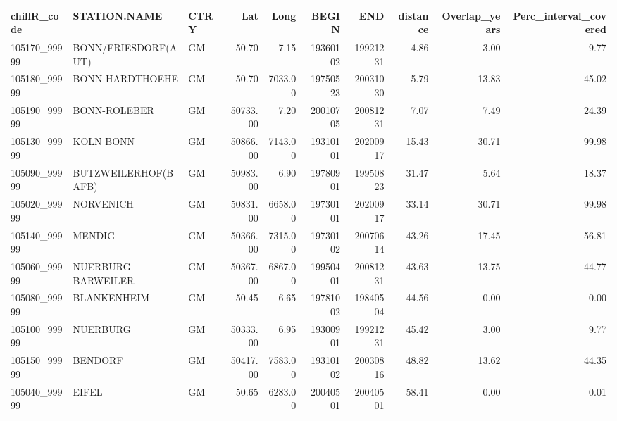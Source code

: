 \documentclass[
]{book}
\newenvironment{Shaded}{\begin{snugshade}}{\end{snugshade}}
\newcommand{\DataTypeTok}[1]{\textcolor[rgb]{0.13,0.29,0.53}{#1}}
\newcommand{\DecValTok}[1]{\textcolor[rgb]{0.00,0.00,0.81}{#1}}
\newcommand{\KeywordTok}[1]{\textcolor[rgb]{0.13,0.29,0.53}{\textbf{#1}}}
\newcommand{\NormalTok}[1]{#1}
\newcommand{\OperatorTok}[1]{\textcolor[rgb]{0.81,0.36,0.00}{\textbf{#1}}}
\newcommand{\StringTok}[1]{\textcolor[rgb]{0.31,0.60,0.02}{#1}}
\begin{document}
\begin{Shaded}
\end{Shaded}

\begingroup\fontsize{8}{10}\selectfont

\begin{tabular}{l|l|l|r|r|r|r|r|r|r}
\hline
chillR\_code & STATION.NAME & CTRY & Lat & Long & BEGIN & END & distance & Overlap\_years & Perc\_interval\_covered\\
\hline
105170\_99999 & BONN/FRIESDORF(AUT) & GM & 50.70 & 7.15 & 19360102 & 19921231 & 4.86 & 3.00 & 9.77\\
\hline
105180\_99999 & BONN-HARDTHOEHE & GM & 50.70 & 7033.00 & 19750523 & 20031030 & 5.79 & 13.83 & 45.02\\
\hline
105190\_99999 & BONN-ROLEBER & GM & 50733.00 & 7.20 & 20010705 & 20081231 & 7.07 & 7.49 & 24.39\\
\hline
105130\_99999 & KOLN BONN & GM & 50866.00 & 7143.00 & 19310101 & 20200917 & 15.43 & 30.71 & 99.98\\
\hline
105090\_99999 & BUTZWEILERHOF(BAFB) & GM & 50983.00 & 6.90 & 19780901 & 19950823 & 31.47 & 5.64 & 18.37\\
\hline
105020\_99999 & NORVENICH & GM & 50831.00 & 6658.00 & 19730101 & 20200917 & 33.14 & 30.71 & 99.98\\
\hline
105140\_99999 & MENDIG & GM & 50366.00 & 7315.00 & 19730102 & 20070614 & 43.26 & 17.45 & 56.81\\
\hline
105060\_99999 & NUERBURG-BARWEILER & GM & 50367.00 & 6867.00 & 19950401 & 20081231 & 43.63 & 13.75 & 44.77\\
\hline
105080\_99999 & BLANKENHEIM & GM & 50.45 & 6.65 & 19781002 & 19840504 & 44.56 & 0.00 & 0.00\\
\hline
105100\_99999 & NUERBURG & GM & 50333.00 & 6.95 & 19300901 & 19921231 & 45.42 & 3.00 & 9.77\\
\hline
105150\_99999 & BENDORF & GM & 50417.00 & 7583.00 & 19310102 & 20030816 & 48.82 & 13.62 & 44.35\\
\hline
105040\_99999 & EIFEL & GM & 50.65 & 6283.00 & 20040501 & 20040501 & 58.41 & 0.00 & 0.01\\

\end{tabular}
\end{document}
